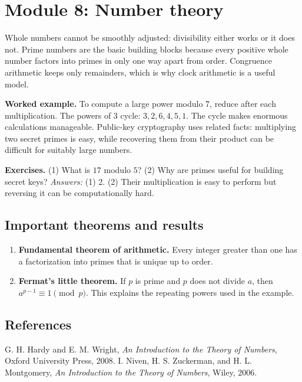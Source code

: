 \documentclass[11pt,oneside]{book}
\makeatletter
\renewenvironment{thebibliography}[1]
  {\list{\@biblabel{\@arabic\c@enumiv}}%
    {\settowidth\labelwidth{\@biblabel{#1}}%
     \leftmargin\labelwidth
     \advance\leftmargin\labelsep
     \usecounter{enumiv}%
     \let\p@enumiv\@empty
     \renewcommand\theenumiv{\@arabic\c@enumiv}}}
  {\endlist}
\makeatother
\begin{document}
\chapter[Module 8: Number theory]{Module 8: Number theory}
Whole numbers cannot be smoothly adjusted: divisibility either works or it does not. Prime numbers are the basic building blocks because every positive whole number factors into primes in only one way apart from order. Congruence arithmetic keeps only remainders, which is why clock arithmetic is a useful model.

\textbf{Worked example.} To compute a large power modulo 7, reduce after each multiplication. The powers of 3 cycle: $3,2,6,4,5,1$. The cycle makes enormous calculations manageable. Public-key cryptography uses related facts: multiplying two secret primes is easy, while recovering them from their product can be difficult for suitably large numbers.

\textbf{Exercises.} (1) What is $17$ modulo $5$? (2) Why are primes useful for building secret keys? \emph{Answers:} (1) 2. (2) Their multiplication is easy to perform but reversing it can be computationally hard.

\section*{Important theorems and results}
\begin{enumerate}[leftmargin=*,itemsep=0.35em]
\item \textbf{Fundamental theorem of arithmetic.} Every integer greater than one has a factorization into primes that is unique up to order.

\item \textbf{Fermat's little theorem.} If $p$ is prime and $p$ does not divide $a$, then $a^{p-1}\equiv1\pmod p$. This explains the repeating powers used in the example.
\end{enumerate}

\section*{References}
\begin{thebibliography}{9}
 G. H. Hardy and E. M. Wright, \emph{An Introduction to the Theory of Numbers}, Oxford University Press, 2008.
 I. Niven, H. S. Zuckerman, and H. L. Montgomery, \emph{An Introduction to the Theory of Numbers}, Wiley, 2006.
\end{thebibliography}
\end{document}
